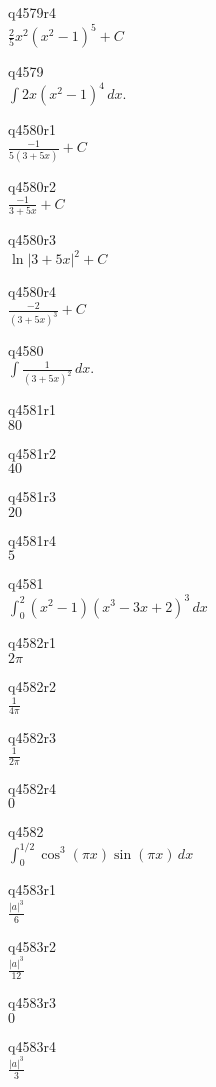 q4579r4\\
\(\displaystyle \frac{2}{5} x^2(x^2 - 1)^5 + C \)

q4579\\
\(\displaystyle \int 2x (x^2 - 1)^4 \, dx. \)

q4580r1\\
\(\displaystyle \frac{-1}{5(3+5x)} + C \)

q4580r2\\
\(\displaystyle \frac{-1}{3 + 5x} + C \)

q4580r3\\
\(\displaystyle \ln | 3 + 5x|^2 + C \)

q4580r4\\
\(\displaystyle \frac{-2}{(3+5x)^3} + C \)

q4580\\
\(\displaystyle \int \frac{1}{(3+5x)^2}\,dx. \)

q4581r1\\
\(\displaystyle 80 \)

q4581r2\\
\(\displaystyle 40 \)

q4581r3\\
\(\displaystyle 20 \)

q4581r4\\
\(\displaystyle 5 \)

q4581\\
\(\displaystyle \int_0^2 (x^2 - 1)(x^3 - 3x + 2)^3 \, dx \)

q4582r1\\
\(\displaystyle 2\pi \)

q4582r2\\
\(\displaystyle \frac{1}{4\pi} \)

q4582r3\\
\(\displaystyle \frac{1}{2\pi} \)

q4582r4\\
\(\displaystyle 0 \)

q4582\\
\(\displaystyle \int_0^{1/2} \cos^3(\pi x) \sin (\pi x) \, dx \)

q4583r1\\
\(\displaystyle \frac{|a|^3}{6} \)

q4583r2\\
\(\displaystyle \frac{|a|^3}{12} \)

q4583r3\\
\(\displaystyle 0 \)

q4583r4\\
\(\displaystyle \frac{|a|^3}{3} \)

